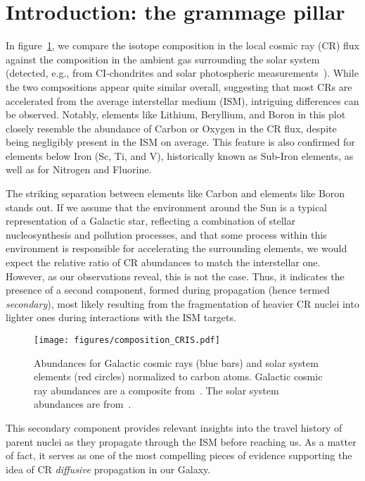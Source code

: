 \section{Introduction: the grammage pillar}
\label{sec:intro}

In figure~\ref{fig:composition}, we compare the isotope composition in the local cosmic ray (CR) flux against the composition in the ambient gas surrounding the solar system (detected, e.g., from CI-chondrites and solar photospheric measurements~\cite{Looders2009}). While the two compositions appear quite similar overall, suggesting that most CRs are accelerated from the average interstellar medium (ISM), intriguing differences can be observed.
%
Notably, elements like Lithium, Beryllium, and Boron in this plot closely resemble the abundance of Carbon or Oxygen in the CR flux, despite being negligibly present in the ISM on average. This feature is also confirmed for elements below Iron (Sc, Ti, and V), historically known as Sub-Iron elements, as well as for Nitrogen and Fluorine.

The striking separation between elements like Carbon and elements like Boron stands out. If we assume that the environment around the Sun is a typical representation of a Galactic star, reflecting a combination of stellar nucleosynthesis and pollution processes, and that some process within this environment is responsible for accelerating the surrounding elements, we would expect the relative ratio of CR abundances to match the interstellar one.
%
However, as our observations reveal, this is not the case. Thus, it indicates the presence of a second component, formed during propagation (hence termed \emph{secondary}), most likely resulting from the fragmentation of heavier CR nuclei into lighter ones during interactions with the ISM targets.

\begin{figure}
\centering
\texttt{[image: figures/composition\_CRIS.pdf]}    
\caption{Abundances for Galactic cosmic rays (blue bars) and solar system elements (red circles) normalized to carbon atoms. Galactic cosmic ray abundances are a composite from~\cite{Young1981apj,AMS02results}. The solar system abundances are from~\cite{Looders2009}.}
\label{fig:composition}
\end{figure}

This secondary component provides relevant insights into the travel history of parent nuclei as they propagate through the ISM before reaching us.
%
As a matter of fact, it serves as one of the most compelling pieces of evidence supporting the idea of CR \emph{diffusive} propagation in our Galaxy.

